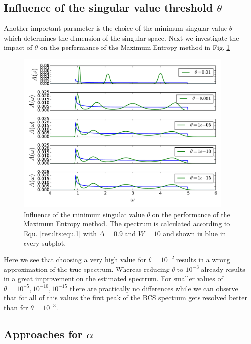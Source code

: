 \subsection*{Influence of the singular value threshold $\theta$}
Another important parameter is the choice of the minimum singular value $\theta$ which determines the dimension of the singular space.
Next we investigate the impact of $\theta$ on the performance of the Maximum Entropy method in Fig. \ref{results:fig.3}
\begin{figure}[htbp]
	\centering
	\includegraphics[width=0.95\textwidth]{./images/BCS_varying_cutoffs.pdf}
	\caption{Influence of the minimum singular value $\theta$ on the performance of the Maximum Entropy method. The spectrum is calculated according to Equ. \ref{results:equ.1} with $\Delta = 0.9$ and $W = 10$ and shown in blue in every subplot.}
	\label{results:fig.3}
\end{figure}
\FloatBarrier
Here we see that choosing a very high value for $\theta = 10^{-2}$ results in a wrong approximation of the true spectrum. Whereas reducing $\theta$ to $10^{-3}$ already results in a great improvement on the estimated spectrum. For smaller values of $\theta = 10^{-5},10^{-10},10^{-15}$ there are practically no differences while we can observe that for all of this values the first peak of the BCS spectrum gets resolved better than for $\theta = 10^{-3}$.\

\subsection*{Approaches for $\alpha$}

